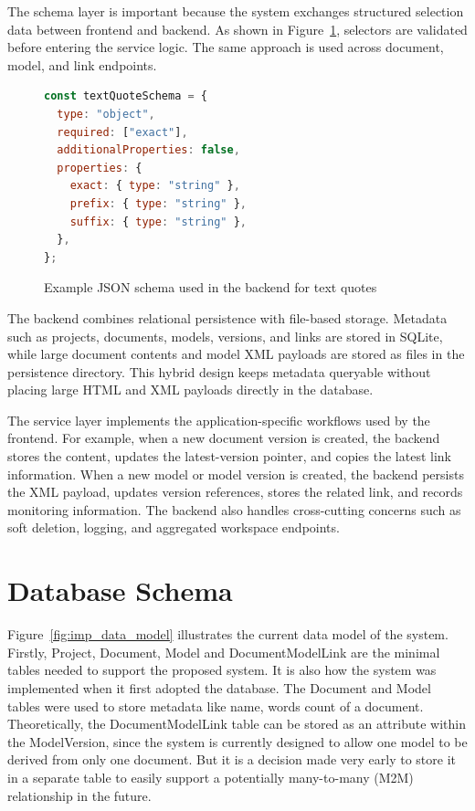 The schema layer is important because the system exchanges structured selection data between frontend and backend. As shown in Figure~\ref{fig:imp_backend_schema_example}, selectors are validated before entering the service logic. The same approach is used across document, model, and link endpoints.

\begin{figure}[H]
  \centering
  \caption{Example JSON schema used in the backend for text quotes}
  \label{fig:imp_backend_schema_example}
  \begin{lstlisting}[language=JavaScript]
const textQuoteSchema = {
  type: "object",
  required: ["exact"],
  additionalProperties: false,
  properties: {
    exact: { type: "string" },
    prefix: { type: "string" },
    suffix: { type: "string" },
  },
};
  \end{lstlisting}
\end{figure}

The backend combines relational persistence with file-based storage. Metadata such as projects, documents, models, versions, and links are stored in SQLite, while large document contents and model XML payloads are stored as files in the persistence directory. This hybrid design keeps metadata queryable without placing large HTML and XML payloads directly in the database.

The service layer implements the application-specific workflows used by the frontend. For example, when a new document version is created, the backend stores the content, updates the latest-version pointer, and copies the latest link information. When a new model or model version is created, the backend persists the XML payload, updates version references, stores the related link, and records monitoring information. The backend also handles cross-cutting concerns such as soft deletion, logging, and aggregated workspace endpoints. 

\section{Database Schema}

Figure~\ref{fig:imp_data_model} illustrates the current data model of the system. Firstly, Project, Document, Model and DocumentModelLink are the minimal tables needed to support the proposed system. It is also how the system was implemented when it first adopted the database. The Document and Model tables were used to store metadata like name, words count of a document. Theoretically, the DocumentModelLink table can be stored as an attribute within the ModelVersion, since the system is currently designed to allow one model to be derived from only one document. But it is a decision made very early to store it in a separate table to easily support a potentially many-to-many (M2M) relationship in the future.

